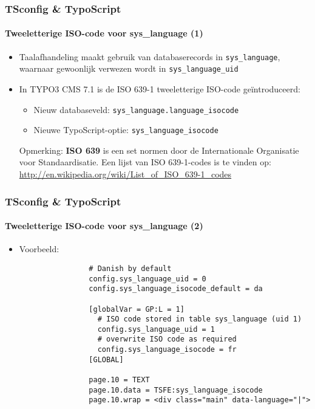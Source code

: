 \begin{frame}[fragile]
	\frametitle{TSconfig \& TypoScript}
	\framesubtitle{Tweeletterige ISO-code voor sys\_language (1)}

	\begin{itemize}
		\item Taalafhandeling maakt gebruik van databaserecords in
			\texttt{sys\_language}, waarnaar gewoonlijk verwezen wordt in \texttt{sys\_language\_uid}
		\item In TYPO3 CMS 7.1 is de ISO 639-1 tweeletterige ISO-code geïntroduceerd:

			\begin{itemize}
				\item Nieuw databaseveld: \texttt{sys\_language.language\_isocode}
				\item Nieuwe TypoScript-optie: \texttt{sys\_language\_isocode}
			\end{itemize}


		\vspace{0.5cm}

		\small
			Opmerking: \textbf{ISO 639} is een set normen door de Internationale Organisatie voor Standaardisatie. 
			Een lijst van ISO 639-1-codes is te vinden op:\newline
			\url{http://en.wikipedia.org/wiki/List_of_ISO_639-1_codes}
		\normalsize

	\end{itemize}

\end{frame}


\begin{frame}[fragile]
	\frametitle{TSconfig \& TypoScript}
	\framesubtitle{Tweeletterige ISO-code voor sys\_language (2)}

	\begin{itemize}
		\item Voorbeeld:

			\begin{lstlisting}
				# Danish by default
				config.sys_language_uid = 0
				config.sys_language_isocode_default = da

				[globalVar = GP:L = 1]
				  # ISO code stored in table sys_language (uid 1)
				  config.sys_language_uid = 1
				  # overwrite ISO code as required
				  config.sys_language_isocode = fr
				[GLOBAL]

				page.10 = TEXT
				page.10.data = TSFE:sys_language_isocode
				page.10.wrap = <div class="main" data-language="|">
			\end{lstlisting}

	\end{itemize}

\end{frame}


